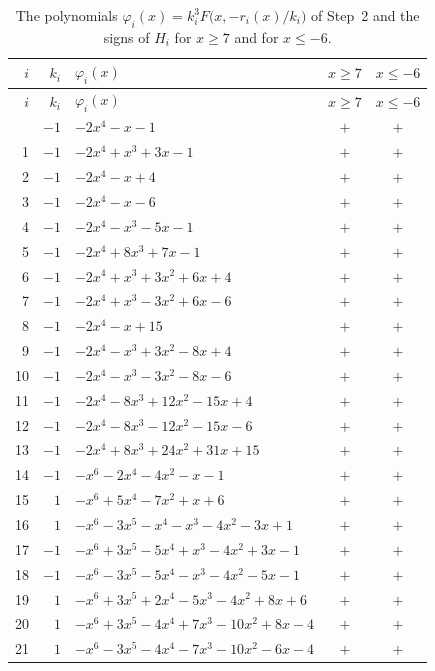 \documentclass[11pt]{article}
\begin{document}
\begingroup\footnotesize
\setlength{\LTcapwidth}{\textwidth}
\begin{longtable}{@{}rrlcc@{}}
\caption{The polynomials $\varphi_i(x)=k_i^3F\bigl(x,-r_i(x)/k_i\bigr)$ of Step~2 and the signs of $H_i$ for $x\geq7$ and for $x\leq-6$.}\label{tab:phi}\\
\hline $i$ & $k_i$ & $\varphi_i(x)$ & $x\geq7$ & $x\leq-6$\\\hline\endfirsthead\hline $i$ & $k_i$ & $\varphi_i(x)$ & $x\geq7$ & $x\leq-6$\\\hline\endhead\hline\endfoot
0 & $-1$ & $-2x^{4}-x-1$ & $+$ & $+$\\
1 & $-1$ & $-2x^{4}+x^{3}+3x-1$ & $+$ & $+$\\
2 & $-1$ & $-2x^{4}-x+4$ & $+$ & $+$\\
3 & $-1$ & $-2x^{4}-x-6$ & $+$ & $+$\\
4 & $-1$ & $-2x^{4}-x^{3}-5x-1$ & $+$ & $+$\\
5 & $-1$ & $-2x^{4}+8x^{3}+7x-1$ & $+$ & $+$\\
6 & $-1$ & $-2x^{4}+x^{3}+3x^{2}+6x+4$ & $+$ & $+$\\
7 & $-1$ & $-2x^{4}+x^{3}-3x^{2}+6x-6$ & $+$ & $+$\\
8 & $-1$ & $-2x^{4}-x+15$ & $+$ & $+$\\
9 & $-1$ & $-2x^{4}-x^{3}+3x^{2}-8x+4$ & $+$ & $+$\\
10 & $-1$ & $-2x^{4}-x^{3}-3x^{2}-8x-6$ & $+$ & $+$\\
11 & $-1$ & $-2x^{4}-8x^{3}+12x^{2}-15x+4$ & $+$ & $+$\\
12 & $-1$ & $-2x^{4}-8x^{3}-12x^{2}-15x-6$ & $+$ & $+$\\
13 & $-1$ & $-2x^{4}+8x^{3}+24x^{2}+31x+15$ & $+$ & $+$\\
14 & $-1$ & $-x^{6}-2x^{4}-4x^{2}-x-1$ & $+$ & $+$\\
15 & $1$ & $-x^{6}+5x^{4}-7x^{2}+x+6$ & $+$ & $+$\\
16 & $1$ & $-x^{6}-3x^{5}-x^{4}-x^{3}-4x^{2}-3x+1$ & $+$ & $+$\\
17 & $-1$ & $-x^{6}+3x^{5}-5x^{4}+x^{3}-4x^{2}+3x-1$ & $+$ & $+$\\
18 & $-1$ & $-x^{6}-3x^{5}-5x^{4}-x^{3}-4x^{2}-5x-1$ & $+$ & $+$\\
19 & $1$ & $-x^{6}+3x^{5}+2x^{4}-5x^{3}-4x^{2}+8x+6$ & $+$ & $+$\\
20 & $1$ & $-x^{6}+3x^{5}-4x^{4}+7x^{3}-10x^{2}+8x-4$ & $+$ & $+$\\
21 & $1$ & $-x^{6}-3x^{5}-4x^{4}-7x^{3}-10x^{2}-6x-4$ & $+$ & $+$\\

\end{longtable}
\end{document}
